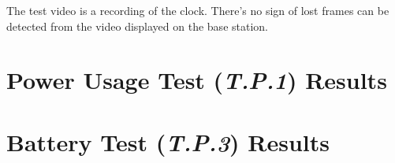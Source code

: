 \documentclass[10pt,letterpaper]{article}
\begin{document}
The test video is a recording of the clock. There's no sign of lost frames can be detected from the video displayed on the base station.
 
 \section{Power Usage Test (\textit{T.P.1}) Results}\label{appendix:T.P.1}
 
 \section{Battery Test (\textit{T.P.3}) Results}\label{appendix:T.P.3}
 

\end{document}
